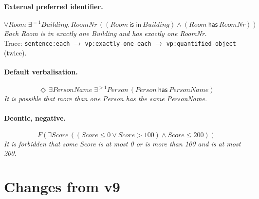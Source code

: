 \documentclass[11pt, a4paper]{article}
\newcommand{\code}[1]{\texttt{\color{codefg}#1}}
\begin{document}
\paragraph{External preferred identifier.}
\[
\forall \mathit{Room}\;\exists^{=1}\mathit{Building},\mathit{RoomNr}\,((\mathit{Room}\ \textsf{is in}\ \mathit{Building}) \wedge (\mathit{Room}\ \textsf{has}\ \mathit{RoomNr}))
\]
\textit{Each Room is in exactly one Building and has exactly one RoomNr.}\\
Trace: \code{sentence:each} $\to$ \code{vp:exactly-one-each} $\to$
\code{vp:quantified-object} (twice).

\paragraph{Default verbalisation.}
\[
\Diamond\,\exists \mathit{PersonName}\;\exists^{>1}\mathit{Person}\,(\mathit{Person}\ \textsf{has}\ \mathit{PersonName})
\]
\textit{It is possible that more than one Person has the same PersonName.}

\paragraph{Deontic, negative.}
\[
F(\exists \mathit{Score}\,((\mathit{Score} \le 0 \vee \mathit{Score} > 100) \wedge \mathit{Score} \le 200))
\]
\textit{It is forbidden that some Score is at most 0 or is more than 100 and
is at most 200.}

\section{Changes from v9}
\end{document}
